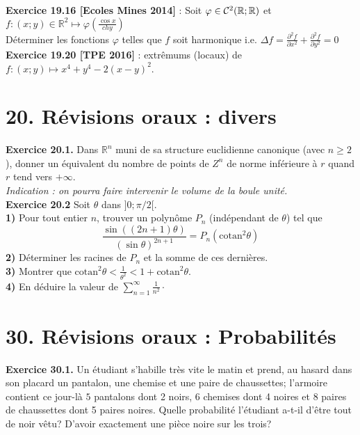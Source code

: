 \documentclass[a4paper,12pt,francais]{article}
\newcommand{\field}[1]{\mathbb{#1}}
\newcommand{\R}{\field{R}}
\begin{document}
\noindent
{\bf Exercice 19.16 [Ecoles Mines 2014]} : Soit $\varphi \in {\cal{C}}^2(\R;\R)$ et $f:(x;y) \in \R^2 \mapsto \varphi \left({ \frac{\cos x}{ch y}}\right)$\\
Déterminer les fonctions $\varphi$ telles que $f$ soit harmonique i.e. $\Delta f = \frac{\partial^2 f}{\partial x^2}+ \frac{\partial^2 f}{\partial y^2}=0$\\

\noindent
{\bf Exercice 19.20 [TPE 2016]} : extrêmums (locaux) de $f:(x;y) \mapsto x^4+y^4-2(x-y)^2$.\\



\newpage
\section*{20. Révisions oraux : divers}

\noindent
{\bf Exercice 20.1.} Dans $\R^n$ muni de sa structure euclidienne
canonique (avec $n\geqslant 2$), donner un équivalent du nombre de
points de $Z^n$ de norme inférieure à $r$ quand $r$ tend vers
$+\infty$.\\
{\it Indication : on pourra faire intervenir le volume de la boule
  unité.}\\
  
\noindent
{\bf Exercice 20.2} Soit $\theta$ dans $]0;\pi/2[$.\\
\indent
{\bf 1)} Pour tout entier $n$, trouver un polynôme $P_n$ (indépendant de $\theta$) tel que 
$$\frac{\sin((2n+1)\theta)}{ (\sin \theta)^{2n+1}}=P_n(\mbox{cotan}^2 \theta)$$
\indent
{\bf 2)} Déterminer les racines de $P_n$ et la somme de ces dernières.\\
\indent
{\bf 3)} Montrer que $\mbox{cotan}^2 \theta < \frac{1}{\theta^2} <1+\mbox{cotan}^2 \theta$.\\
\indent
{\bf 4)} En déduire la valeur de $\displaystyle \sum_{n=1}^\infty \frac{1}{n^2} \cdot$


\newpage
\section*{30. Révisions oraux : Probabilités} %

\noindent
{\bf Exercice 30.1.}
Un étudiant s'habille très vite le matin et prend, au hasard dans son placard un pantalon, une chemise et une paire de chaussettes; l'armoire contient ce jour-là $5$ pantalons dont 2 noirs, 6 chemises dont 4 noires et 8 paires de chaussettes dont 5 paires noires. Quelle probabilité l'étudiant a-t-il d'être tout de noir vêtu? D'avoir exactement une pièce noire sur les trois?\\
\end{document}
